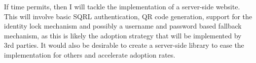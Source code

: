 If time permits, then I will tackle the implementation of a server-side website. This will involve basic SQRL authentication, QR code generation, support for the identity lock mechanism and possibly a username and password based fallback mechanism, as this is likely the adoption strategy that will be implemented by 3rd parties. It would also be desirable to create a server-side library to ease the implementation for others and accelerate adoption rates.
